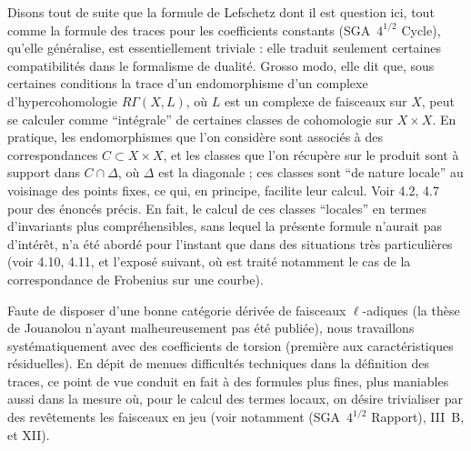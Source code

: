 \documentclass[11pt]{article}
\begin{document}
Disons tout de suite que la formule de Lefschetz dont il est question ici, tout comme la formule des traces pour les coefficients constants (SGA~$4^{1/2}$ Cycle), qu'elle généralise, est essentiellement triviale : elle traduit seulement certaines compatibilités dans le formalisme de dualité. Grosso modo, elle dit que, sous certaines conditions la trace d'un endomorphisme d'un complexe d'hypercohomologie $R\Gamma(X,L)$, où $L$ est un complexe de faisceaux sur $X$, peut se calculer comme ``intégrale'' de certaines classes de cohomologie sur $X \times X$. En pratique, les endomorphismes que l'on considère sont associés à des correspondances $C \subset X \times X$, et les classes que l'on récupère sur le produit sont à support dans $C \cap \Delta$, où $\Delta$ est la diagonale ; ces classes sont ``de nature locale'' au voisinage des points fixes, ce qui, en principe, facilite leur calcul. Voir 4.2, 4.7 pour des énoncés précis. En fait, le calcul de ces classes ``locales'' en termes d'invariants plus compréhensibles, sans lequel la présente formule n'aurait pas d'intérêt, n'a été abordé pour l'instant que dans des situations très particulières (voir 4.10, 4.11, et l'exposé suivant, où est traité notamment le cas de la correspondance de Frobenius sur une courbe).

Faute de disposer d'une bonne catégorie dérivée de faisceaux $\ell$-adiques 
(la thèse de
Jouanolou n'ayant malheureusement pas été publiée), nous travaillons systématiquement avec des coefficients de torsion (première aux caractéristiques résiduelles). En dépit de menues difficultés techniques dans la définition des traces, ce point de vue conduit en fait à des formules plus fines, plus maniables aussi dans la mesure où, pour le calcul des termes locaux, on désire trivialiser par des revêtements les faisceaux en jeu (voir notamment (SGA~$4^{1/2}$ Rapport), III~B, et XII).
\end{document}
